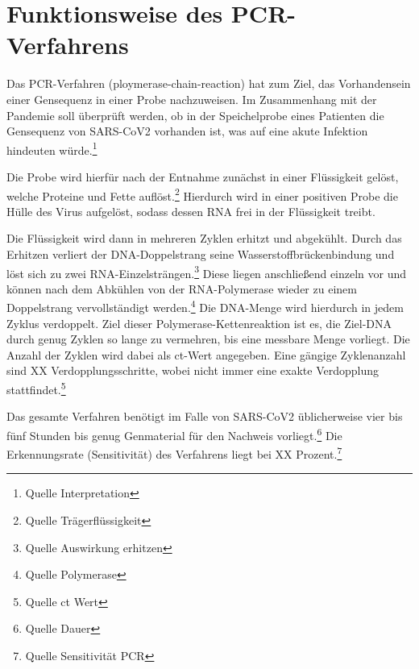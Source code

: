 \cleardoublepage

\section{Funktionsweise des PCR-Verfahrens}
Das PCR-Verfahren (ploymerase-chain-reaction) hat zum Ziel, das Vorhandensein einer Gensequenz in einer Probe nachzuweisen.
Im Zusammenhang mit der Pandemie soll überprüft werden, ob in der Speichelprobe eines Patienten die Gensequenz von SARS-CoV2 vorhanden ist, was auf eine akute Infektion hindeuten würde.\footnote{Quelle Interpretation}

Die Probe wird hierfür nach der Entnahme zunächst in einer Flüssigkeit gelöst, welche Proteine und Fette auflöst.\footnote{Quelle Trägerflüssigkeit}
Hierdurch wird in einer positiven Probe die Hülle des Virus aufgelöst, sodass dessen RNA frei in der Flüssigkeit treibt.

Die Flüssigkeit wird dann in mehreren Zyklen erhitzt und abgekühlt.
Durch das Erhitzen verliert der DNA-Doppelstrang seine Wasserstoffbrückenbindung und löst sich zu zwei RNA-Einzelsträngen.\footnote{Quelle Auswirkung erhitzen}
Diese liegen anschließend einzeln vor und können nach dem Abkühlen von der RNA-Polymerase wieder zu einem Doppelstrang vervollständigt werden.\footnote{Quelle Polymerase}
Die DNA-Menge wird hierdurch in jedem Zyklus verdoppelt.
Ziel dieser Polymerase-Kettenreaktion ist es, die Ziel-DNA durch genug Zyklen so lange zu vermehren, bis eine messbare Menge vorliegt.
Die Anzahl der Zyklen wird dabei als ct-Wert angegeben.
Eine gängige Zyklenanzahl sind XX Verdopplungsschritte, wobei nicht immer eine exakte Verdopplung stattfindet.\footnote{Quelle ct Wert}

Das gesamte Verfahren benötigt im Falle von SARS-CoV2 üblicherweise vier bis fünf Stunden bis genug Genmaterial für den Nachweis vorliegt.\footnote{Quelle Dauer}
Die Erkennungsrate (Sensitivität) des Verfahrens liegt bei XX Prozent.\footnote{Quelle Sensitivität PCR}

\cleardoublepage

